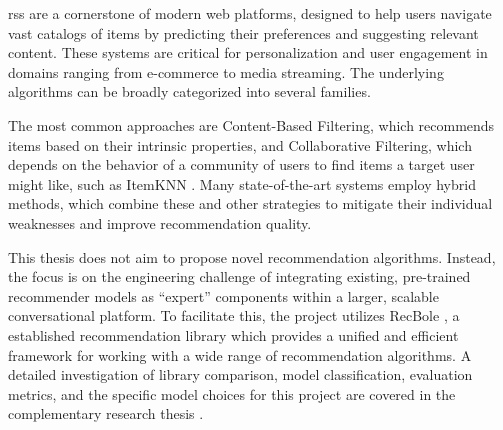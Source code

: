 \aclp{rs} are a cornerstone of modern web platforms, designed to help users navigate vast catalogs of items by predicting their preferences and suggesting relevant content. These systems are critical for personalization and user engagement in domains ranging from e-commerce to media streaming. The underlying algorithms can be broadly categorized into several families.

The most common approaches are Content-Based Filtering, which recommends items based on their intrinsic properties, and Collaborative Filtering, which depends on the behavior of a community of users to find items a target user might like, such as ItemKNN \cite{ITEMKNN}. Many state-of-the-art systems employ hybrid methods, which combine these and other strategies to mitigate their individual weaknesses and improve recommendation quality.

This thesis does not aim to propose novel recommendation algorithms. Instead, the focus is on the engineering challenge of integrating existing, pre-trained recommender models as ``expert'' components within a larger, scalable conversational platform. To facilitate this, the project utilizes RecBole \cite{RECBOLE}, a established recommendation library which provides a unified and efficient framework for working with a wide range of recommendation algorithms. A detailed investigation of library comparison, model classification, evaluation metrics, and the specific model choices for this project are covered in the complementary research thesis \cite{MUI2ICSI-THESIS}.